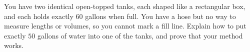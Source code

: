 You have two identical open-topped tanks, each shaped like a rectangular box, and each holds exactly $60$ gallons when full. You have a hose but no way to measure lengths or volumes, so you cannot mark a fill line. Explain how to put exactly $50$ gallons of water into one of the tanks, and prove that your method works.
